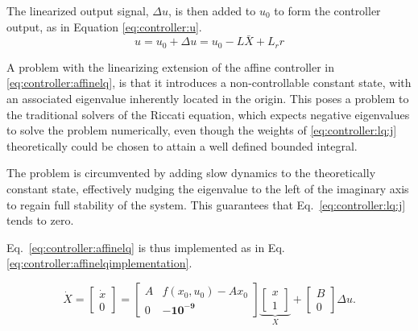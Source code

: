     The linearized output signal, $\Delta u$, is then added
    to $u_{0}$ to form the controller output, as in Equation \eqref{eq:controller:u}.
    \begin{equation}
    \label{eq:controller:u}
        u = u_{0} + \Delta u = u_{0} - L\bar{X} + L_{r}r
    \end{equation}

    A problem with the linearizing extension of the affine controller in \eqref{eq:controller:affinelq},
    is that it introduces a non-controllable constant state, with
    an associated eigenvalue inherently located in the origin.
    This poses a problem to the traditional solvers of the Riccati equation, which
    expects negative eigenvalues to solve the problem numerically, even though
    the weights of \eqref{eq:controller:lq:j} theoretically could be chosen to
    attain a well defined bounded integral.

    The problem is circumvented by adding slow dynamics to the theoretically
    constant state, effectively nudging the eigenvalue to the left of the
    imaginary axis to regain full stability of the system.
    This guarantees that Eq.~\eqref{eq:controller:lq:j} tends to zero.

    Eq.~\eqref{eq:controller:affinelq} is thus implemented as in Eq. \eqref{eq:controller:affinelqimplementation}.

    \begin{equation}
    \label{eq:controller:affinelqimplementation}
        \dot{X} = \left[
        \begin{array}{c}
            \dot{x} \\
            0
        \end{array}\right] =
        \left[
        \begin{array}{cc}
            A & f(x_{0},u_{0})-Ax_{0} \\
            0 & \mathbf{-10^{-9}}
        \end{array}\right]
        \underbrace{\left[
        \begin{array}{c}
            x \\
            1
        \end{array}\right]}_{X}
        +
        \left[
        \begin{array}{c}
            B \\
            0
        \end{array}\right]
        \Delta u.
    \end{equation}
